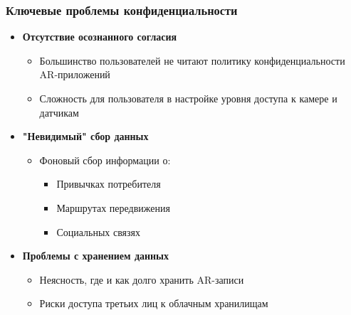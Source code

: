 \subsubsection{Ключевые проблемы конфиденциальности}
\begin{itemize}
    \item \textbf{Отсутствие осознанного согласия}
    \begin{itemize}
        \item Большинство пользователей не читают политику конфиденциальности AR-приложений
        \item Сложность для пользователя в настройке уровня доступа к камере и датчикам
    \end{itemize}
    
    \item \textbf{"Невидимый" сбор данных}
    \begin{itemize}
        \item Фоновый сбор информации о:
        \begin{itemize}
            \item Привычках потребителя
            \item Маршрутах передвижения
            \item Социальных связях
        \end{itemize}
    \end{itemize}
    
    \item \textbf{Проблемы с хранением данных}
    \begin{itemize}
        \item Неясность, где и как долго хранить AR-записи
        \item Риски доступа третьих лиц к облачным хранилищам
    \end{itemize}
\end{itemize}

